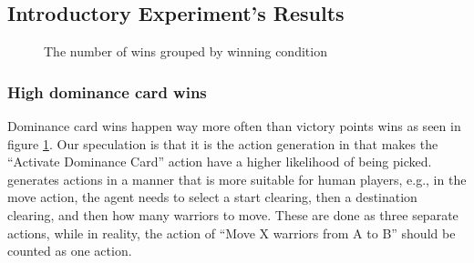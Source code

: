 \subsection{Introductory Experiment's Results}

\begin{figure}
    \centering
    \caption{The number of wins grouped by winning condition}
    \label{fig:wins-by-winner-condition}
\end{figure}

\subsubsection{High dominance card wins} \label{high-dominance-card-wins}
Dominance card wins happen way more often than victory points wins as seen in figure \ref{fig:wins-by-winner-condition}. Our speculation is that it is the action generation in \RootOurs{} that makes the ``Activate Dominance Card'' action have a higher likelihood of being picked. \RootOurs{} generates actions in a manner that is more suitable for human players, e.g., in the move action, the agent needs to select a start clearing, then a destination clearing, and then how many warriors to move. These are done as three separate actions, while in reality, the action of ``Move X warriors from A to B'' should be counted as one action.

